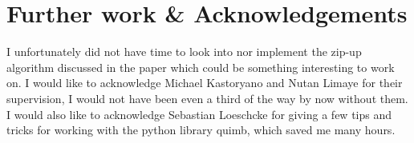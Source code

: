 \section{Further work \& Acknowledgements}
I unfortunately did not have time to look into nor implement the zip-up algorithm discussed in the paper which could be something interesting to work on.  
I would like to acknowledge Michael Kastoryano and Nutan Limaye for their supervision, I would not have been even a third of the way by now without them. I would also like to acknowledge Sebastian Loeschcke for giving a few tips and tricks for working with the python library quimb, which saved me many hours.   

